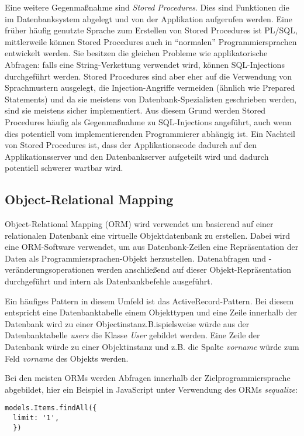	Eine weitere Gegenmaßnahme sind \textit{Stored Procedures}. Dies sind Funktionen die im Datenbanksystem abgelegt und von der Applikation aufgerufen werden. Eine früher häufig genutzte Sprache zum Erstellen von Stored Procedures ist PL/SQL, mittlerweile können Stored Procedures auch in ``normalen'' Programmiersprachen entwickelt werden. Sie besitzen die gleichen Probleme wie applikatorische Abfragen: falls eine String-Verkettung verwendet wird, können SQL-Injections durchgeführt werden. Stored Procedures sind aber eher auf die Verwendung von Sprachmustern ausgelegt, die Injection-Angriffe vermeiden (ähnlich wie Prepared Statements) und da sie meistens von Datenbank-Spezialisten geschrieben werden, sind sie meistens sicher implementiert. Aus diesem Grund werden Stored Procedures häufig als Gegenmaßnahme zu SQL-Injections angeführt, auch wenn dies potentiell vom implementierenden Programmierer abhängig ist. Ein Nachteil von Stored Procedures ist, dass der Applikationscode dadurch auf den Applikationsserver und den Datenbankserver aufgeteilt wird und dadurch potentiell schwerer wartbar wird.

\subsection{Object-Relational Mapping}

Object-Relational Mapping (ORM) wird verwendet um basierend auf einer relationalen Datenbank eine virtuelle Objektdatenbank zu erstellen. Dabei wird eine ORM-Software verwendet, um aus Datenbank-Zeilen eine Repräsentation der Daten als Programmiersprachen-Objekt herzustellen. Datenabfragen und -veränderungsoperationen werden anschließend auf dieser Objekt-Repräsentation durchgeführt und intern als Datenbankbefehle ausgeführt.

Ein häufiges Pattern in diesem Umfeld ist das ActiveRecord-Pattern. Bei diesem entspricht eine Datenbanktabelle einem Objekttypen und eine Zeile innerhalb der Datenbank wird zu einer Objectinstanz.B.ispielsweise würde aus der Datenbanktabelle \textit{users} die Klasse \textit{User} gebildet werden. Eine Zeile der Datenbank würde zu einer Objektinstanz und z.B. die Spalte \textit{vorname} würde zum Feld \textit{vorname} des Objekts werden.

Bei den meisten ORMs werden Abfragen innerhalb der Zielprogrammiersprache abgebildet, hier ein Beispiel in JavaScript unter Verwendung des ORMs \textit{sequalize}:

\begin{verbatim}
models.Items.findAll({
  limit: '1',
  })
\end{verbatim}

